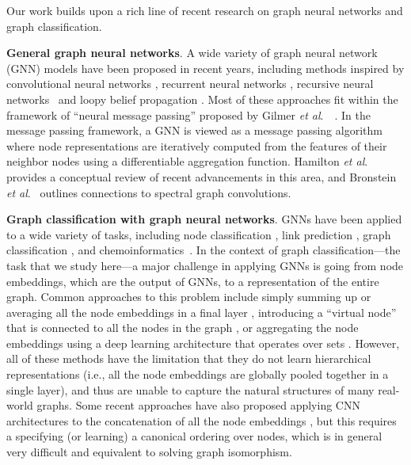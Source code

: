 \documentclass{article}
\newcommand{\xhdr}[1]{{\noindent\bfseries #1}.}
\newcommand{\etal}{\textit{et al}.~}
\begin{document}
Our work builds upon a rich line of recent research on graph neural networks and graph classification. 

\xhdr{General graph neural networks}
A wide variety of graph neural network (GNN) models have been proposed in recent years, including methods inspired by convolutional neural networks \cite{Bru+2014,Def+2015,Duv+2015,hamilton2017inductive,kipf2017semi,Lei+2017,niepert2016learning, Vel+2018}, recurrent neural networks \cite{Li+2016}, recursive neural networks~\cite{bianchini2001,Sca+2009} and loopy belief propagation \cite{dai2016discriminative}. 
Most of these approaches fit within the framework of ``neural message passing'' proposed by Gilmer \etal~\cite{Gil+2017}. 
In the message passing framework, a GNN is viewed as a message passing algorithm where node representations are iteratively computed from the features of their neighbor nodes using a differentiable aggregation function.
Hamilton \etal~\cite{Ham+2017a} provides a conceptual review of recent advancements in this area, and Bronstein \etal \cite{bronstein2017geometric} outlines connections to spectral graph convolutions. 

\xhdr{Graph classification with graph neural networks}
GNNs have been applied to a wide variety of tasks, including node classification \cite{hamilton2017inductive,kipf2017semi}, link prediction \cite{kipf2018}, graph classification \cite{dai2016discriminative,Duv+2015,zhang2018end}, and chemoinformatics~\cite{Mer+2005,Lus+2013,Fou+2017,Jin+2018,Sch+2017}. 
In the context of graph classification---the task that we study here---a major challenge in applying GNNs is going from node embeddings, which are the output of GNNs, to a representation of the entire graph. 
Common approaches to this problem include simply summing up or averaging all the node embeddings in a final layer \cite{Duv+2015}, introducing a ``virtual node'' that is connected to all the nodes in the graph \cite{Li+2016}, or aggregating the node embeddings using a deep learning architecture that operates over sets \cite{Gil+2017}.
However, all of these methods have the limitation that they do not learn hierarchical representations (i.e., all the node embeddings are globally pooled together in a single layer), and thus are unable to capture the natural structures of many real-world graphs.
Some recent approaches have also proposed applying CNN architectures to the concatenation of all the node embeddings \cite{niepert2016learning,zhang2018end}, but this requires a specifying (or learning) a canonical ordering over nodes, which is in general very difficult and equivalent to solving graph isomorphism. 
\end{document}
